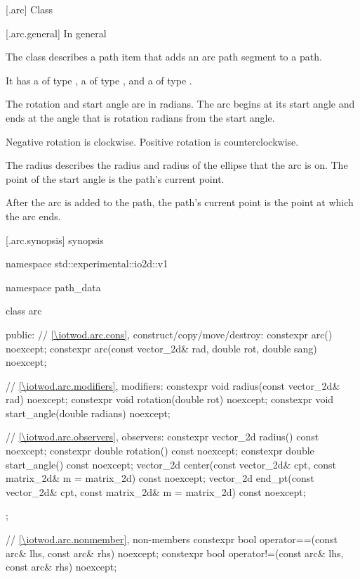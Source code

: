  [\iotwod.arc] {Class }

 [\iotwod.arc.general] {In general}

\pnum
{}%
The class  describes a path item that adds an arc path segment to a path.

\pnum
It has a  of type , a  of type , and a  of type .

\pnum
The rotation and start angle are in radians. The arc begins at its start angle and ends at the angle that is rotation radians from the start angle.

\pnum
\begin{note}
Negative rotation is clockwise. Positive rotation is counterclockwise.
\end{note}

\pnum
The radius describes the \xaxis radius and \yaxis radius of the ellipse that the arc is on. The point of the start angle is the path's current point.

\pnum
After the arc is added to the path, the path's current point is the point at which the arc ends.

 [\iotwod.arc.synopsis] { synopsis}

\begin{codeblock}
namespace std::experimental::io2d::v1 {
  namespace path_data {
    class arc {
    public:
      // \ref{\iotwod.arc.cons}, construct/copy/move/destroy:
      constexpr arc() noexcept;
      constexpr arc(const vector_2d& rad,
        double rot, double sang) noexcept;

      // \ref{\iotwod.arc.modifiers}, modifiers:
      constexpr void radius(const vector_2d& rad) noexcept;
      constexpr void rotation(double rot) noexcept;
      constexpr void start_angle(double radians) noexcept;

      // \ref{\iotwod.arc.observers}, observers:
      constexpr vector_2d radius() const noexcept;
      constexpr double rotation() const noexcept;
      constexpr double start_angle() const noexcept;
      vector_2d center(const vector_2d& cpt, const matrix_2d& m = matrix_2d{}) 
        const noexcept;
      vector_2d end_pt(const vector_2d& cpt, const matrix_2d& m = matrix_2d{}) 
        const noexcept;
    };
    
    // \ref{\iotwod.arc.nonmember}, non-members
    constexpr bool operator==(const arc& lhs, const arc& rhs) noexcept;
    constexpr bool operator!=(const arc& lhs, const arc& rhs) noexcept;
  }
}
\end{codeblock}

